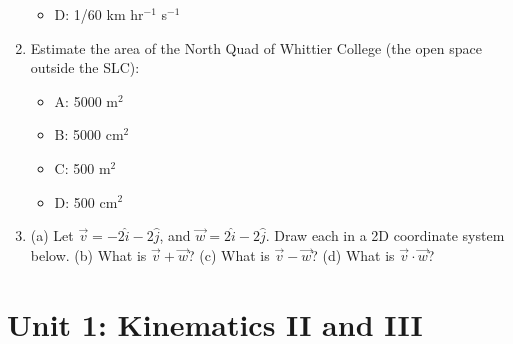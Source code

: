 \documentclass[10pt]{article}
\begin{document}
\begin{enumerate}
\begin{itemize}
\item D: 1/60 km hr$^{-1}$ s$^{-1}$
\end{itemize}
\item Estimate the area of the North Quad of Whittier College (the open space outside the SLC):
\begin{itemize}
\item A: 5000 m$^2$
\item B: 5000 cm$^2$
\item C: 500 m$^2$
\item D: 500 cm$^2$
\end{itemize}
\item (a) Let $\vec{v} = -2\hat{i} - 2\hat{j}$, and $\vec{w} = 2\hat{i} - 2\hat{j}$.  Draw each in a 2D coordinate system below. (b) What is $\vec{v} + \vec{w}$?  (c) What is $\vec{v} - \vec{w}$? (d) What is $\vec{v} \cdot \vec{w}$? \\ \vspace{3cm}
\end{enumerate}

\section{Unit 1: Kinematics II and III}
\end{document}
